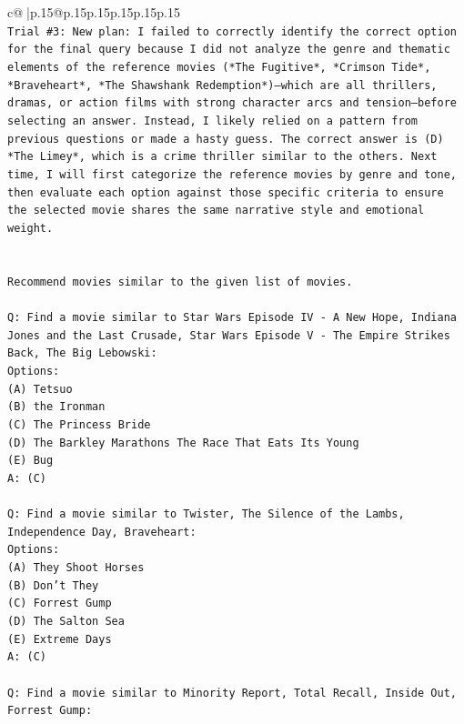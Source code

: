 \documentclass{article}
\begin{document}
{\begin{supertabular}{c@{$\;$}|p{.15\linewidth}@{}p{.15\linewidth}p{.15\linewidth}p{.15\linewidth}p{.15\linewidth}p{.15\linewidth}}
{{{\\ 
\texttt{Trial \#3: New plan: I failed to correctly identify the correct option for the final query because I did not analyze the genre and thematic elements of the reference movies (*The Fugitive*, *Crimson Tide*, *Braveheart*, *The Shawshank Redemption*)—which are all thrillers, dramas, or action films with strong character arcs and tension—before selecting an answer. Instead, I likely relied on a pattern from previous questions or made a hasty guess. The correct answer is (D) *The Limey*, which is a crime thriller similar to the others. Next time, I will first categorize the reference movies by genre and tone, then evaluate each option against those specific criteria to ensure the selected movie shares the same narrative style and emotional weight.} \\
\\ 
\\ 
\texttt{Recommend movies similar to the given list of movies.} \\
\\ 
\texttt{Q: Find a movie similar to Star Wars Episode IV {-} A New Hope, Indiana Jones and the Last Crusade, Star Wars Episode V {-} The Empire Strikes Back, The Big Lebowski:} \\
\texttt{Options:} \\
\texttt{(A) Tetsuo} \\
\texttt{(B) the Ironman} \\
\texttt{(C) The Princess Bride} \\
\texttt{(D) The Barkley Marathons The Race That Eats Its Young} \\
\texttt{(E) Bug} \\
\texttt{A: (C)} \\
\\ 
\texttt{Q: Find a movie similar to Twister, The Silence of the Lambs, Independence Day, Braveheart:} \\
\texttt{Options:} \\
\texttt{(A) They Shoot Horses} \\
\texttt{(B) Don't They} \\
\texttt{(C) Forrest Gump} \\
\texttt{(D) The Salton Sea} \\
\texttt{(E) Extreme Days} \\
\texttt{A: (C)} \\
\\ 
\texttt{Q: Find a movie similar to Minority Report, Total Recall, Inside Out, Forrest Gump:} \\
}}}
\end{supertabular}}
\end{document}
